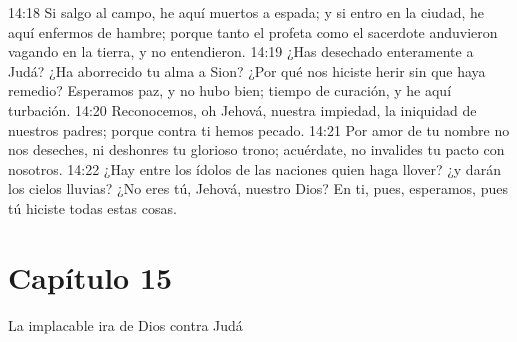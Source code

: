 14:18 Si salgo al campo, he aquí muertos a espada; y si entro en la ciudad, he aquí enfermos de hambre; porque tanto el profeta como el sacerdote anduvieron vagando en la tierra, y no entendieron. 
14:19 ¿Has desechado enteramente a Judá? ¿Ha aborrecido tu alma a Sion? ¿Por qué nos hiciste herir sin que haya remedio? Esperamos paz, y no hubo bien; tiempo de curación, y he aquí turbación. 
14:20 Reconocemos, oh Jehová, nuestra impiedad, la iniquidad de nuestros padres; porque contra ti hemos pecado. 
14:21 Por amor de tu nombre no nos deseches, ni deshonres tu glorioso trono; acuérdate, no invalides tu pacto con nosotros. 
14:22 ¿Hay entre los ídolos de las naciones quien haga llover? ¿y darán los cielos lluvias? ¿No eres tú, Jehová, nuestro Dios? En ti, pues, esperamos, pues tú hiciste todas estas cosas. 
\section*{Capítulo 15} 
La implacable ira de Dios contra Judá 
 
